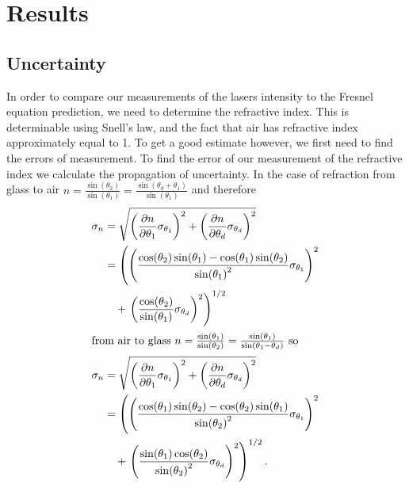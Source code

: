 \chapter{Results}
\section{Uncertainty}
In order to compare our measurements of the lasers intensity to the Fresnel equation prediction, we need to determine the refractive index.
This is determinable using Snell's law, and the fact that air has refractive index approximately equal to 1.
To get a good estimate however, we first need to find the errors of measurement. 
To find the error of our measurement of the refractive index we calculate the propagation of uncertainty.
In the case of refraction from glass to air $n = \frac{\sin(\theta_2)}{\sin(\theta_1)} = \frac{\sin(\theta_d + \theta_1)}{\sin(\theta_1)}$ and therefore
\begin{align*}
    \sigma_n &= \sqrt{\left(\frac{\partial n}{\partial \theta_1} \sigma_{\theta_1} \right)^2 + \left(\frac{\partial n}{\partial \theta_d} \sigma_{\theta_d} \right)^2} \\
    &= \left(\left( \frac{\cos(\theta_2)\sin(\theta_1) - \cos(\theta_1)\sin(\theta_2)}{\sin(\theta_1)^2} \sigma_{\theta_1} \right)^2\right.\\
    &\quad + \left.\left(\frac{\cos(\theta_2)}{\sin(\theta_1)} \sigma_{\theta_d} \right)^2\right)^{1/2} \\
\intertext{from air to glass $n = \frac{\sin(\theta_1)}{\sin(\theta_2)} = \frac{\sin(\theta_1)}{\sin(\theta_1 - \theta_d)}$ so}
    \sigma_n &= \sqrt{\left(\frac{\partial n}{\partial \theta_1} \sigma_{\theta_1} \right)^2 + \left(\frac{\partial n}{\partial \theta_d} \sigma_{\theta_d} \right)^2} \\
    &= \left(\left( \frac{\cos(\theta_1)\sin(\theta_2) - \cos(\theta_2)\sin(\theta_1)}{\sin(\theta_2)^2} \sigma_{\theta_1} \right)^2\right.\\
    &\quad + \left.\left(\frac{\sin(\theta_1)\cos(\theta_2)}{\sin(\theta_2)^2} \sigma_{\theta_d} \right)^2\right)^{1/2}. \\
\end{align*}

